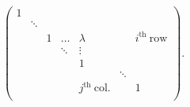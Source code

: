 \documentclass[a4paper,12pt]{report}
\begin{document}
\begin{appendices}
\begin{equation}
\begin{aligned}
\begin{pmatrix}
        1 &  &  &  &  &  &   \\
         & \ddots  &  &  &  &  &   \\
         &  & 1 & \ldots  & \lambda  &  & i^{\text{th }}\text{row}   \\
         &  &  & \ddots  & \vdots  &  &   \\
         &  &  &  & 1 &  &   \\
         &  &  &  &  & \ddots  &   \\
         &  &  &  & j^{\text{th }}\text{col.}  &  & 1  \\
    \end{pmatrix} .
    \end{aligned}
\end{equation}




\end{appendices}
\end{document}
